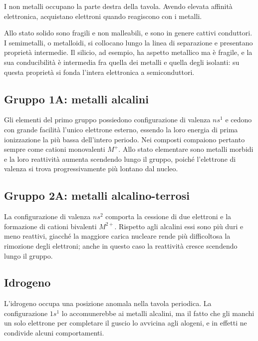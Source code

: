 I non metalli occupano la parte destra della tavola.
Avendo elevata affinità elettronica, acquistano elettroni quando reagiscono con i metalli.

Allo stato solido sono fragili e non malleabili, e sono in genere cattivi conduttori. \\

I semimetalli, o metalloidi, si collocano lungo la linea di separazione e presentano proprietà intermedie. 
Il silicio, ad esempio, ha aspetto metallico ma è fragile, e la sua conducibilità è intermedia fra quella dei metalli e quella degli isolanti: su questa proprietà si fonda l'intera elettronica a semiconduttori.

\subsection{Gruppo 1A: metalli alcalini}

Gli elementi del primo gruppo possiedono configurazione di valenza $ns^1$ e cedono con grande facilità l'unico elettrone esterno, essendo la loro energia di prima ionizzazione la più bassa dell'intero periodo. 
Nei composti compaiono pertanto sempre come cationi monovalenti $M^+$. 
Allo stato elementare sono metalli morbidi e la loro reattività aumenta scendendo lungo il gruppo, poiché l'elettrone di valenza si trova progressivamente più lontano dal nucleo.\\

\subsection{Gruppo 2A: metalli alcalino-terrosi}

La configurazione di valenza $ns^2$ comporta la cessione di due elettroni e la formazione di cationi bivalenti $M^{2+}$. 
Rispetto agli alcalini essi sono più duri e meno reattivi, giacché la maggiore carica nucleare rende più difficoltosa la rimozione degli elettroni; anche in questo caso la reattività cresce scendendo lungo il gruppo.\\

\subsection{Idrogeno}

L'idrogeno occupa una posizione anomala nella tavola periodica. La configurazione $1s^1$ lo accomunerebbe ai metalli alcalini, ma il fatto che gli manchi un solo elettrone per completare il guscio lo avvicina agli alogeni, e in effetti ne condivide alcuni comportamenti.\\

